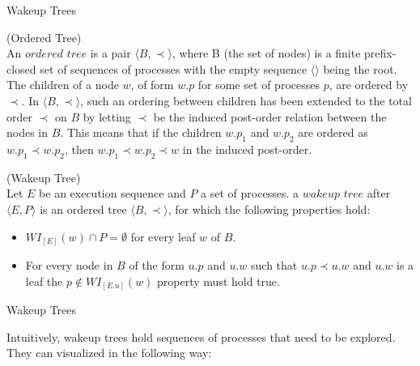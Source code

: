 \begin{frame} {Wakeup Trees}


\begin{definition}{(Ordered Tree)}\label{def:Ordered}\\
An $ordered$ $tree$ is a pair $\langle B , \prec \rangle$, where B (the set of nodes) is a finite prefix-closed
    set of sequences of processes with the empty sequence $\langle\rangle$ being the root.
    The children of a node $w$, of form $w.p$ for some set of processes $p$, are ordered by $\prec$. 
    In $\langle B , \prec \rangle$, such an ordering between children has been extended to the total 
    order $\prec$ on $B$ by letting $\prec$ be the induced post-order relation between the nodes in $B$.
    This means that if the children $w.p_1$ and $w.p_2$ are ordered as $w.p_1 \prec w.p_2$,
    then $w.p_1 \prec w.p_2 \prec w $ in the induced post-order.
\end{definition}

\begin{definition}{(Wakeup Tree)}\\
    Let $E$ be an execution sequence and $P$ a set of processes. a $wakeup$ $tree$ after $\langle E , P \rangle$
    is an ordered tree $\langle B , \prec \rangle$, for which the following properties hold:
    \begin{itemize}
        \item $WI_{[E]}(w) \cap P = \emptyset$ for every leaf $w$ of $B$.
        \item For every node in $B$ of the form $u.p$ and $u.w$ such that $u.p \prec u.w$ and $u.w$ is a leaf
        the $p \not \in WI_{[E.u]}(w)$ property must hold true.
    \end{itemize}
\end{definition}

\end{frame}


\begin{frame} {Wakeup Trees}

Intuitively, wakeup trees hold sequences of processes that
need to be explored. They can visualized in the following way:

\pause


\end{frame}

